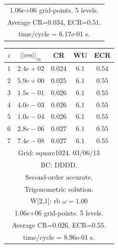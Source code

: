 \begin{table}[hbt]
\begin{center}
{\begin{tabular}{|c|c|c|c|c|}
\multicolumn{5}{|c|}{1.06e+06 grid-points. 5 levels.}  \\
\multicolumn{5}{|c|}{Average CR=$0.034$, ECR=$0.51$.}  \\
\multicolumn{5}{|c|}{time/cycle = 6.17e-01 s.}  \\
\hline 
\end{tabular}
\begin{tabular}{|c|c|c|c|c|} \hline 
 $i$   & $\vert\vert\mbox{res}\vert\vert_\infty$  &  CR     &  WU    & ECR  \\   \hline 
 $ 1$  & $ 2.4e+02$ & $0.024$ & $ 6.1$ & $0.54$ \\ 
 $ 2$  & $ 5.9e+00$ & $0.025$ & $ 6.1$ & $0.55$ \\ 
 $ 3$  & $ 1.5e-01$ & $0.026$ & $ 6.1$ & $0.55$ \\ 
 $ 4$  & $ 4.0e-03$ & $0.026$ & $ 6.1$ & $0.55$ \\ 
 $ 5$  & $ 1.0e-04$ & $0.026$ & $ 6.1$ & $0.55$ \\ 
 $ 6$  & $ 2.8e-06$ & $0.027$ & $ 6.1$ & $0.55$ \\ 
 $ 7$  & $ 7.4e-08$ & $0.027$ & $ 6.1$ & $0.55$ \\ 
\hline 
\multicolumn{5}{|c|}{Grid: square1024. 03/06/13}  \\
\multicolumn{5}{|c|}{BC: DDDD.}  \\
\multicolumn{5}{|c|}{Second-order accurate.}  \\
\multicolumn{5}{|c|}{Trigonometric solution.}  \\
\multicolumn{5}{|c|}{W[2,1]: rb $\omega=1.00$}  \\
\multicolumn{5}{|c|}{1.06e+06 grid-points. 5 levels.}  \\
\multicolumn{5}{|c|}{Average CR=$0.026$, ECR=$0.55$.}  \\
\multicolumn{5}{|c|}{time/cycle = 8.96e-01 s.}  \\
\hline 
\end{tabular}
}
\end{center}
\end{table}
